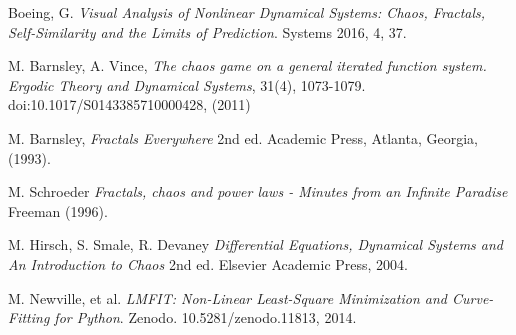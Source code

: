 \documentclass[letterpaper,12pt,oneside]{book}
\begin{document}
\begin{thebibliography}{9}



 Boeing, G. \textit{Visual Analysis of Nonlinear Dynamical Systems: Chaos, Fractals, Self-Similarity and the Limits of Prediction}. Systems 2016, 4, 37. 

M. Barnsley, A. Vince, \textit{The chaos game on a general iterated function system. Ergodic Theory and Dynamical Systems}, 31(4), 1073-1079. doi:10.1017/S0143385710000428, (2011)


 M. Barnsley,  \textit{Fractals Everywhere} 2nd ed. Academic Press, Atlanta, Georgia, (1993).

 M. Schroeder \textit{Fractals, chaos and power laws - Minutes from an Infinite Paradise} Freeman (1996).

 M. Hirsch, S. Smale, R. Devaney \textit{Differential Equations, Dynamical Systems and An Introduction to Chaos} 2nd ed. Elsevier Academic Press, 2004.


\bibitem{} M. Newville, et al. \textit{LMFIT: Non-Linear Least-Square Minimization and Curve-Fitting for Python}. Zenodo. 10.5281/zenodo.11813, 2014.

\end{thebibliography}

%
%

\backmatter%
\end{document}
